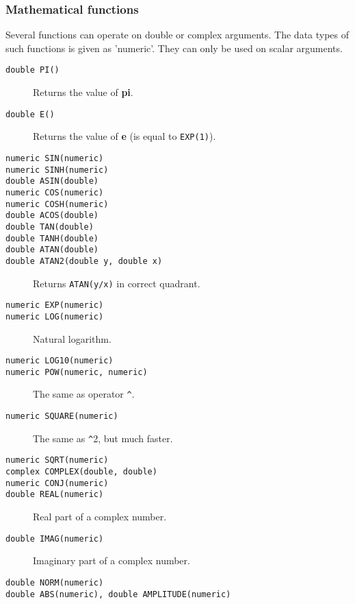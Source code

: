 \subsubsection{Mathematical functions}
Several functions can operate on double or complex arguments.
The data types of such functions is given as 'numeric'.
They can only be used on scalar arguments.
\begin{description}
  \item[ \texttt{double PI()}] Returns the value of \textbf{pi}.
  \item[ \texttt{double E()}] Returns the value of \textbf{e} (is equal to \texttt{EXP(1)}).
  \item[ \texttt{numeric SIN(numeric)}]
  \item[ \texttt{numeric SINH(numeric)}]
  \item[ \texttt{double ASIN(double)}]
  \item[ \texttt{numeric COS(numeric)}]
  \item[ \texttt{numeric COSH(numeric)}]
  \item[ \texttt{double ACOS(double)}]
  \item[ \texttt{double TAN(double)}]
  \item[ \texttt{double TANH(double)}]
  \item[ \texttt{double ATAN(double)}]
  \item[ \texttt{double ATAN2(double y, double x)}]
       Returns \texttt{ATAN(y/x)} in correct quadrant.
  \item[ \texttt{numeric EXP(numeric)}]
  \item[ \texttt{numeric LOG(numeric)}] Natural logarithm.
  \item[ \texttt{numeric LOG10(numeric)}]
  \item[ \texttt{numeric POW(numeric, numeric)}] The same as operator \verb+^+.
  \item[ \texttt{numeric SQUARE(numeric)}] The same as \verb+^+2, but much faster.
  \item[ \texttt{numeric SQRT(numeric)}]
  \item[ \texttt{complex COMPLEX(double, double)}]
  \item[ \texttt{numeric CONJ(numeric)}]
  \item[ \texttt{double REAL(numeric)}] Real part of a complex number.
  \item[ \texttt{double IMAG(numeric)}] Imaginary part of a complex number.
  \item[ \texttt{double NORM(numeric)}]
  \item[ \texttt{double ABS(numeric),  double AMPLITUDE(numeric)}]

\end{description}
